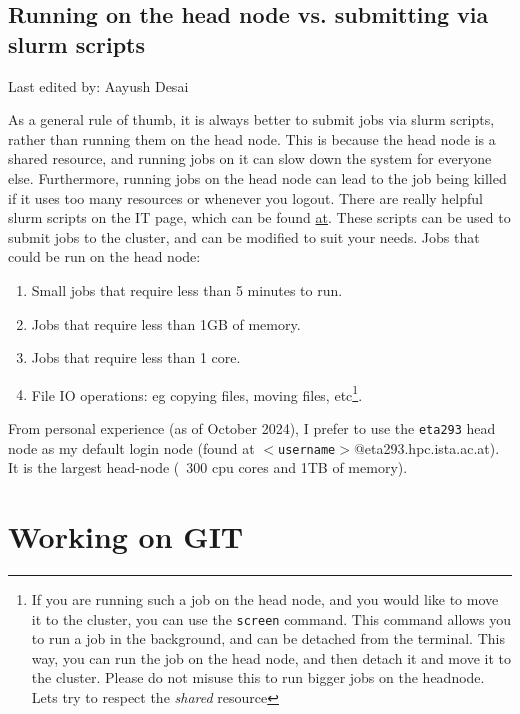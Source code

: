 \documentclass{article}
\newcommand{\setlasteditor}[1]{\gdef\lasteditor{#1}}
\newcommand{\lastedited}{%
    \vspace{1mm} {\footnotesize Last edited by: \lasteditor} \vspace{3mm}
    \newline

}
\begin{document}
\subsection{Running on the head node vs. submitting via slurm scripts}
\setlasteditor{Aayush Desai}
\lastedited
\noindent
As a general rule of thumb, it is always better to submit jobs via slurm scripts, rather than running them on the head node. This is because the head node is a shared resource, and running jobs on it can slow down the system for everyone else. Furthermore, running jobs on the head node can lead to the job being killed if it uses too many resources or whenever you logout. 
\newline
\newline
There are really helpful slurm scripts on the IT page, which can be found \href{https://it.pages.ist.ac.at/docs/hpc-cluster/hpc-handbook/composing-a-slurm-script/}{at}. These scripts can be used to submit jobs to the cluster, and can be modified to suit your needs.
\newline
\newline
\noindent
Jobs that could be run on the head node:
\begin{enumerate}
    \item Small jobs that require less than 5 minutes to run.
    \item Jobs that require less than 1GB of memory.
    \item Jobs that require less than 1 core.
    \item File IO operations: eg copying files, moving files, etc\footnote{If you are running such a job on the head node, and you would like to move it to the cluster, you can use the \texttt{screen} command. This command allows you to run a job in the background, and can be detached from the terminal. This way, you can run the job on the head node, and then detach it and move it to the cluster. Please do not misuse this to run bigger jobs on the headnode. Lets try to respect the \textit{shared} resource}.
\end{enumerate}
\noindent
From personal experience (as of October 2024), I prefer to use the \texttt{eta293} head node as my default login node (found at \texttt{$<$username$>$}@eta293.hpc.ista.ac.at). It is the largest head-node (~300 cpu cores and 1TB of memory).

\section{Working on GIT}
\end{document}
